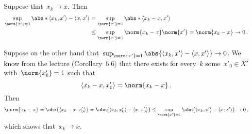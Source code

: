 \subsection{}

Suppose that~$x_k \to x$.
Then
\begin{align*}
  \sup_{\norm{x'} = 1}
  \abs*{ \bil{x_k, x'} - \bil{x, x'} }
  &=
  \sup_{\norm{x'} = 1}
  \abs*{ \bil{x_k - x, x'} }
  \\
  &\leq
  \sup_{\norm{x'} = 1}
  \norm{x_k - x} \norm{x'}
  =
  \norm{x_k - x}
  \to
  0 \,.
\end{align*}

Suppose on the other hand that~$\sup_{\norm{x'} = 1} \abs{ \bil{x_k, x'} - \bil{x, x'} } \to 0$.
We know from the lecture (Corollary~6.6) that there exists for every~$k$ some~$x'_0 \in X'$ with~$\norm{x'_0} = 1$ such that
\[
    \bil{x_k - x, x'_0}
  = \norm{x_k - x} \,.
\]
Then
\[
        \norm{x_k - x}
   =    \abs{ \bil{x_k - x, x'_0} }
   =    \abs{ \bil{x_k, x'_0} - \bil{x, x'_0} }
   \leq \sup_{\norm{x'}  = 1} \abs{ \bil{x_k, x'} - \bil{x, x'} }
   \to  0 \,,
\]
which shows that~$x_k \to x$.




